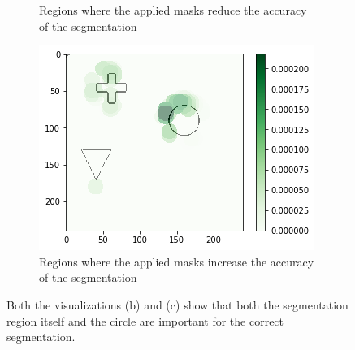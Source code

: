 \begin{figure}[H]
\begin{subfigure}[t]{.34\textwidth}
        \caption{Regions where the applied masks reduce the accuracy of the segmentation}
    \end{subfigure}\hfill%
    \begin{subfigure}[t]{.36\textwidth}
        \centering
        \includegraphics[width=\linewidth]{chapters/06_hdm/testnet/3.png}
        \caption{Regions where the applied masks increase the accuracy of the segmentation}
    \end{subfigure}
    \caption{Both the visualizations (b) and (c) show that both the segmentation region itself and the circle are important for the correct segmentation.}
    \label{hdm_testnet_1}
\end{figure}

